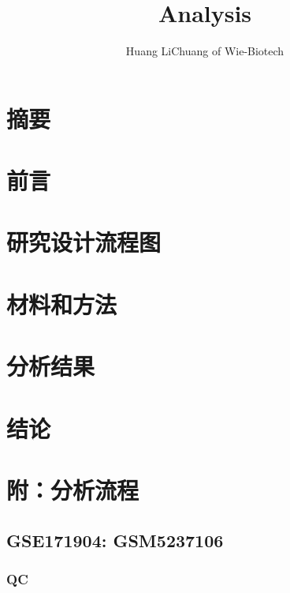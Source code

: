 \documentclass[
]{article}
\title{Analysis}
\author{Huang LiChuang of Wie-Biotech}
\date{}
\begin{document}
\maketitle

{
\setcounter{tocdepth}{3}
\tableofcontents
}
\listoffigures

\listoftables

\hypertarget{abstract}{%
\section{摘要}\label{abstract}}

\hypertarget{introduction}{%
\section{前言}\label{introduction}}

\hypertarget{route}{%
\section{研究设计流程图}\label{route}}

\hypertarget{methods}{%
\section{材料和方法}\label{methods}}

\hypertarget{results}{%
\section{分析结果}\label{results}}

\hypertarget{dis}{%
\section{结论}\label{dis}}

\hypertarget{workflow}{%
\section{附：分析流程}\label{workflow}}

\hypertarget{gse171904-gsm5237106}{%
\subsection{GSE171904: GSM5237106}\label{gse171904-gsm5237106}}

\hypertarget{qc}{%
\subsubsection{QC}\label{qc}}
\end{document}
